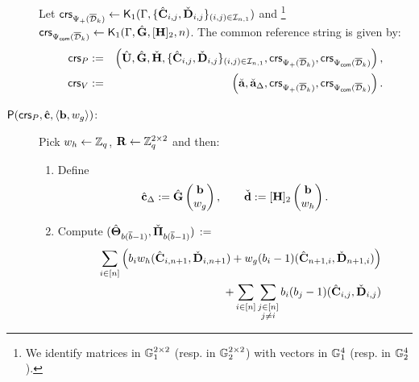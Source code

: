\begin{description}
Let
$\mathsf{crs}_{\Psi_{+}(\overline{\mathcal{D}}_k)} \gets \mathsf{K}_1(\Gamma, \{{\hat{\mathbf{{C}}}}_{i,j},\check{\mathbf{{D}}}_{i,j}\}_{(i,j)\in\mathcal{I}_{n,1}})$ and \footnote{We identify
matrices in $\mathbb{G}_1^{2 \times 2}$ (resp. in $\mathbb{G}_2^{2 \times 2}$) with vectors in $\mathbb{G}_1^{4}$ (resp. in $\mathbb{G}_2^{4}$).}  
 $\mathsf{crs}_{{\Psi_{\mathsf{com}}(\overline{\mathcal{D}}_k)}} \gets \mathsf{K}_1(\Gamma, \hat{\mathbf{{G}}},[{\mathbf{{H}}}]_2,n)$. The common reference string is given by:
\begin{eqnarray*}
\mathsf{crs}_P&:=&\left( \hat{\mathbf{{U}}},  \hat{\mathbf{{G}}},
    \check{\mathbf{{H}}}, \{{\hat{\mathbf{{C}}}}_{i,j},\check{\mathbf{{D}}}_{i,j} \}_{(i,j) \in \mathcal{I}_{n,1}},\mathsf{crs}_{\Psi_{+}(\overline{\mathcal{D}}_k)},\mathsf{crs}_{{\Psi_{\mathsf{com}}(\overline{\mathcal{D}}_k)}} \right), \\
\mathsf{crs}_V&:=&\left(\check{\mathbf{a}}, \check{\mathbf{a}}_\Delta, \mathsf{crs}_{\Psi_{+}(\overline{\mathcal{D}}_k)},\mathsf{crs}_{{\Psi_{\mathsf{com}}(\overline{\mathcal{D}}_k)}} \right). 
 \end{eqnarray*}
\item[$\mathsf{P}(\mathsf{crs}_P, {\hat{\mathbf{c}}}, \langle \mathbf{b}, w_g \rangle)$:]
Pick $w_h \gets \mathbb{Z}_q$,  $\mathbf{{R}} \gets \mathbb{Z}_q^{2\times 2}$ and then: 
\begin{enumerate}
\item Define 
$${\hat{\mathbf{c}}}_{\Delta} := \hat{\mathbf{{G}}} \begin{pmatrix} \mathbf{b} \\ w_g \end{pmatrix},
\qquad \check{\mathbf{d}} := [{\mathbf{{H}}}]_2 \begin{pmatrix} \mathbf{b} \\ w_h \end{pmatrix}.$$ 
\item Compute 
 $({\hat{\mathbf{{\Theta}}}}_{b(\overline{b}-1)}, \check{\mathbf{{\Pi}}}_{b(\overline{b}-1)})\, :=$
\begin{eqnarray} \label{eq:ThetaPi}
& &
    \sum_{i \in [n]}\left(
        b_i w_h (\hmatr{C}_{i,n+1},\cmatr{D}_{i,n+1})+
        w_g(b_i-1) (\hmatr{C}_{n+1,i}, \cmatr{D}_{n+1,i})\right)
        \nonumber\\ & &           +
       \sum_{i \in [n]}  \sum_{\substack{j \in [n]\\ j\neq i}} b_i (b_j-1) (\hmatr{C}_{i,j}, \cmatr{D}_{i,j})\nonumber\\

\end{eqnarray}
\end{enumerate}
\end{description}
